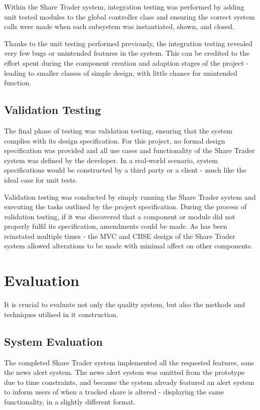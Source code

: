 \documentclass[12pt, a4paper,titlepage]{article}
\begin{document}
Within the Share Trader system, integration testing was performed by adding unit
tested modules to the global controller class and ensuring the correct system
calls were made when each subsystem was instantiated, shown, and closed.

Thanks to the unit testing performed previously, the integration testing
revealed very few bugs or unintended features in the system. 
This can be credited to the effort spent during the component creation and
adaption stages of the project - leading to smaller classes of simple design,
with little chance for unintended function.

\subsection{Validation Testing}
The final phase of testing was validation testing, ensuring that the system
complies with its design specification.  
For this project, no formal design specification was provided and all use
cases and functionality  of the Share Trader system was defined by the
developer.  
In a real-world scenario, system specifications would be constructed by a
third party or a client - much like the ideal case for unit tests.  

Validation testing was conducted by simply running the Share Trader system and
executing the tasks outlined by the project specification.
During the process of validation testing, if it was discovered that a
component or module did not properly fulfil its specification, amendments
could be made.
As has been reinstated multiple times - the MVC and CBSE design of the Share
Trader system allowed alterations to be made with minimal affect on other
components.


\section{Evaluation}
It is crucial to evaluate not only the quality system, but also the methods and
techniques utilised in it construction.

\subsection{System Evaluation}
The completed Share Trader system implemented all the requested features, sans
the news alert system. 
The news alert system was omitted from the prototype due to time constraints,
and because the system already featured an alert system to inform users of
when a tracked share is altered - displaying the same functionality, in a
slightly different format.
\end{document}
